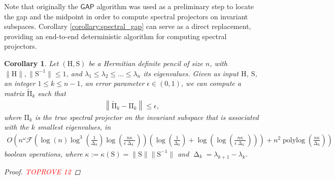 \documentclass{article}
\newcommand{\lnorm}{\left\|}
\newcommand{\rnorm}{\right\|}
\newcommand{\lpar}{\left(}
\newcommand{\rpar}{\right)}
\newtheorem{corollary}{Corollary}[section]
\DeclareMathOperator{\polylog}{polylog}
\DeclareMathOperator{\gap}{\Delta}
\newcommand\matH{\boldsymbol{\mathrm{H}}}
\newcommand\matS{\boldsymbol{\mathrm{S}}}
\newcommand\matPi{\boldsymbol{\mathrm{\Pi}}}
\newcommand\matPitilde{\widetilde{\boldsymbol{\mathrm{\Pi}}}}
\newcommand{\GAP}{\mathsf{GAP}}
\newcommand{\flopcost}{\mathcal{F}}
\newcommand{\projectormatrix}{\matPi}
\newcommand{\projectormatrixtilde}{\matPitilde}
\begin{document}
Note that originally the $\GAP$ algorithm was used as a preliminary step to locate the gap and the midpoint in order to compute spectral projectors on invariant subspaces. Corollary \ref{corollary:spectral_gap} can serve as a direct replacement, providing an end-to-end deterministic algorithm for computing spectral projectors.

\begin{corollary}
    \label{corollary:spectral_projector}
    Let $(\matH,\matS)$ be a Hermitian 
     definite pencil of size $n$, with $\|\matH\|,\|\matS^{-1}\|\leq 1$, and  $\lambda_1\leq\lambda_2\leq\ldots\leq \lambda_n$ its eigenvalues. Given as input $\matH$, $\matS$, an integer $1\leq k\leq n-1$, an error parameter $\epsilon\in(0,1)$, we can compute a matrix $\projectormatrixtilde_k$ such that
    \begin{align*}
            \lnorm \projectormatrixtilde_k - \projectormatrix_k \rnorm \leq \epsilon,
    \end{align*}
    where $\projectormatrix_k$ is the true spectral projector on the invariant subspace that is associated with the $k$ smallest eigenvalues, in 
    \begin{align*}
        O\lpar
            n^{\omega}
            \flopcost
            \lpar
                \log(n)
                \log^3(\tfrac{1}{\gap_k})\log(\tfrac{n\kappa}{\epsilon\gap_k})
            \rpar
            \lpar
            \log(\tfrac{1}{\gap_k})+\log(\log(\tfrac{n\kappa}{\epsilon\gap_k}))
            \rpar
            +
            n^{2}\polylog(\tfrac{n\kappa}{\gap_k})
        \rpar
    \end{align*}
    boolean operations, where $\kappa:=\kappa(\matS)=\|\matS\|\|\matS^{-1}\|$ and $\gap_k=\lambda_{k+1}-\lambda_k$.
\begin{proof}\textcolor{red}{TOPROVE 12}\end{proof}
\end{corollary}
\end{document}
